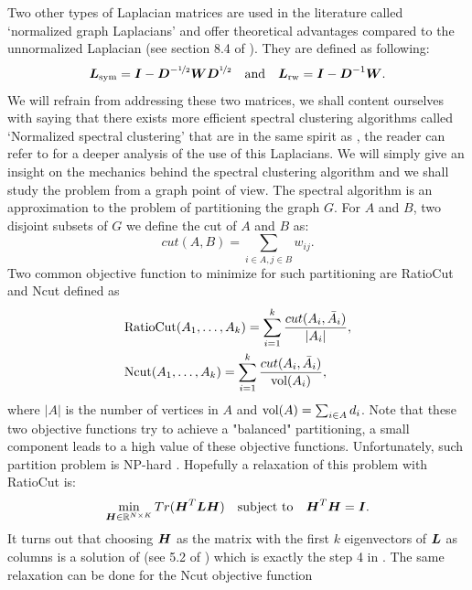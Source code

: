 Two other types of Laplacian matrices are used in the literature called `normalized graph Laplacians' and offer theoretical advantages compared to the unnormalized Laplacian (see section 8.4 of \citep{Luxburg:2007:TSC:1288822.1288832}). They are defined as following:
\begin{equation}
  \boldsymbol L_{\textnormal{sym}} = \boldsymbol I - \boldsymbol D^{-\nicefrac{1}{2}}\boldsymbol W\boldsymbol D^{\nicefrac{1}{2}} \quad \textnormal{and} \quad \boldsymbol L_{\textnormal{rw}}= \boldsymbol I-\boldsymbol D^{-1}\boldsymbol W.
\end{equation}
We will refrain from addressing these two matrices, we shall content ourselves with saying that there exists more efficient spectral clustering algorithms called `Normalized spectral clustering' that are in the same spirit as , the reader can refer to \citep{Shi:2000:NCI:351581.351611,Ng01onspectral,Luxburg:2007:TSC:1288822.1288832} for a deeper analysis of the use of this Laplacians. We will simply give an insight on the mechanics behind the spectral clustering algorithm and we shall study the problem from a graph point of view. The spectral algorithm is an approximation to the problem of partitioning the graph $G$. For $A$ and $B$, two disjoint subsets of $G$ we define the cut of $A$ and $B$ as:
\begin{equation}
  cut(A,B)=\sum_{i\in A, j\in B} w_{ij}.
\end{equation}
Two common objective function to minimize for such partitioning are RatioCut \citep{Hegen1992} and Ncut \citep{Shi:2000:NCI:351581.351611} defined as 
\begin{align*}
&\textnormal{RatioCut}(A_1,\dots,A_k)=\sum_{i=1}^k\frac{cut(A_i,\bar A_i)}{|A_i|},\\
&\textnormal{Ncut}(A_1,\dots,A_k)=\sum_{i=1}^k\frac{cut(A_i,\bar A_i)}{\textnormal{vol}(A_i)},
\end{align*}
where $|A|$ is the number of vertices in $A$ and $\textnormal{vol}(A) = \sum_{i\in A}d_i$. Note that these two objective functions try to achieve a "balanced" partitioning, a small component leads to a high value of these objective functions. Unfortunately, such partition problem is NP-hard \citep{Wagner1993,Luxburg:2007:TSC:1288822.1288832}. Hopefully a relaxation of this problem with RatioCut is:
\begin{equation}
\label{relaxed_ratiocut_pb}
  \min_{\boldsymbol H\in{{\mathbb R}^{N\times K}}} Tr(\boldsymbol H^T\boldsymbol L\boldsymbol H)\quad \textnormal{subject to}\quad \boldsymbol H^T\boldsymbol H = \boldsymbol I.
\end{equation}
It turns out that choosing $\boldsymbol H$ as the matrix with the first $k$ eigenvectors of $\boldsymbol L$ as columns is a solution of  (see 5.2 of \citep{Luxburg:2007:TSC:1288822.1288832}) which is exactly the step 4 in . The same relaxation can be done for the Ncut objective function
